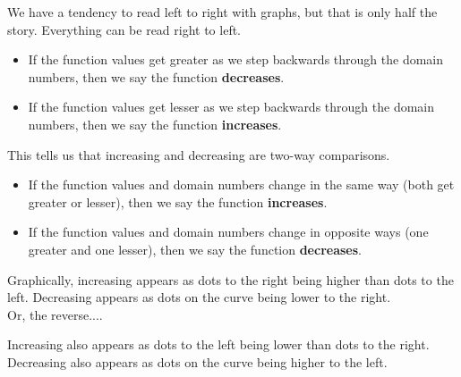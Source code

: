 \documentclass{ximera}
\begin{document}
\begin{warning}
We have a tendency to read left to right with graphs, but that is only half the story.  Everything can be read right to left. \\


\begin{itemize}
    \item If the function values get greater as we step backwards through the domain numbers, then we say the function \textbf{decreases}.  
    \item If the function values get lesser as we step backwards through the domain numbers, then we say the function \textbf{increases}.  
\end{itemize}


This tells us that increasing and decreasing are two-way comparisons.

\begin{itemize}
    \item If the function values and domain numbers change in the same way (both get greater or lesser), then we say the function \textbf{increases}.  
    \item If the function values and domain numbers change in opposite ways (one greater and one lesser), then we say the function \textbf{decreases}. 
\end{itemize}






\end{warning}















Graphically, increasing appears as dots to the right being higher than dots to the left.  Decreasing appears as dots on the curve being lower to the right. \\


Or, the reverse....


Increasing also appears as dots to the left being lower than dots to the right.  \\

Decreasing also appears as dots on the curve being higher to the left. \\
\end{document}
